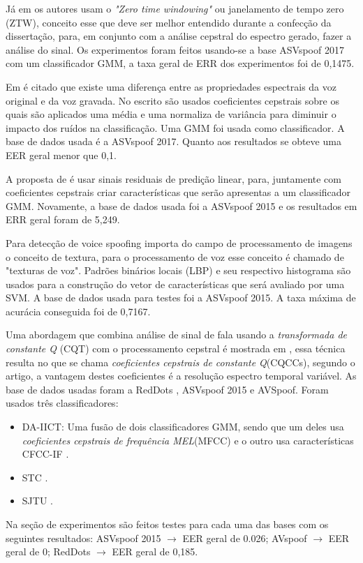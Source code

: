 \documentclass[a4paper,12pt,openright,oneside]{book}
\newenvironment{myenv}[1]
  {\begin{spacing}{#1}}
  {\end{spacing}}
\begin{document}
\begin{myenv}{1.5}
			\par Já em \cite{alluri2019replay} os autores usam o \textit{"Zero time windowing"} ou janelamento de tempo zero (ZTW), conceito esse que deve ser melhor entendido durante a confecção da dissertação, para, em conjunto com a análise cepstral do espectro gerado, fazer a análise do sinal. Os experimentos foram feitos usando-se a base ASVspoof 2017\cite{ASVspoof2017} com um classificador GMM, a taxa geral de ERR dos experimentos foi de 0,1475.
			
			\par Em \cite{8725688} é citado que existe uma diferença entre as propriedades espectrais da voz original e da voz gravada. No escrito são usados coeficientes cepstrais sobre os quais são aplicados uma média e uma normaliza de variância para diminuir o impacto dos ruídos na classificação. Uma GMM foi usada como classificador. A base de dados usada é a ASVspoof 2017. Quanto aos resultados se obteve uma EER geral menor que 0,1.
		
			\par A proposta de \cite{Hanilci2018} é usar sinais residuais de predição linear, para, juntamente com coeficientes cepstrais criar características que serão apresentas a um classificador GMM. Novamente, a base de dados usada foi a ASVspoof 2015 e os resultados em ERR geral foram de 5,249.

			\par Para detecção de voice spoofing  \cite{ISI:000473343500086} importa do campo de processamento de imagens o conceito de textura, para o processamento de voz esse conceito é chamado de "texturas de voz". Padrões binários locais (LBP) e seu respectivo histograma são usados para a construção do vetor de características que será avaliado por uma SVM. A base de dados usada para testes foi a ASVspoof 2015. A taxa máxima de acurácia conseguida foi de 0,7167.
			
			\par Uma abordagem que combina análise de sinal de fala usando a \textit{transformada de constante Q} (CQT) com o processamento cepstral é mostrada em \cite{TODISCO2017516}, essa técnica resulta no que se chama \textit{coeficientes cepstrais de constante Q}(CQCCs), segundo o artigo, a vantagem destes coeficientes é a resolução espectro temporal variável. As base de dados usadas foram a RedDots \cite{redDots}, ASVspoof 2015 e AVSpoof. Foram usados três classificadores:
			\begin{itemize}
				\item DA-IICT: Uma fusão de dois classificadores GMM, sendo que um deles usa \textit{coeficientes cepstrais de frequência MEL}(MFCC) e o outro usa características CFCC-IF \cite{Patel2015}.
				\item STC \cite{7472724}.
				\item SJTU \cite{korshunov2016overview}.
			\end{itemize}			
			Na seção de experimentos são feitos testes para cada uma das bases com os seguintes resultados: ASVspoof 2015 $\rightarrow$ EER geral de 0.026; AVspoof $\rightarrow$ EER geral de 0; RedDots $\rightarrow$ EER geral de 0,185.


\end{myenv}
\end{document}
